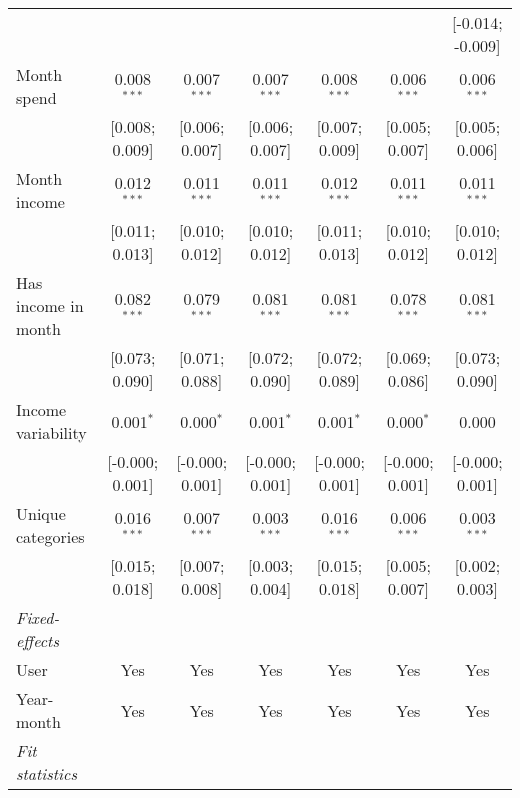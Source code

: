 \begin{table}[htbp]
\begin{threeparttable}[b]
\begin{tabular}{lcccccc}
                                    &                  &                  &                 &                  &                  & [-0.014; -0.009]\\   
         Month spend                & 0.008$^{***}$    & 0.007$^{***}$    & 0.007$^{***}$   & 0.008$^{***}$    & 0.006$^{***}$    & 0.006$^{***}$\\   
                                    & [0.008; 0.009]   & [0.006; 0.007]   & [0.006; 0.007]  & [0.007; 0.009]   & [0.005; 0.007]   & [0.005; 0.006]\\   
         Month income               & 0.012$^{***}$    & 0.011$^{***}$    & 0.011$^{***}$   & 0.012$^{***}$    & 0.011$^{***}$    & 0.011$^{***}$\\   
                                    & [0.011; 0.013]   & [0.010; 0.012]   & [0.010; 0.012]  & [0.011; 0.013]   & [0.010; 0.012]   & [0.010; 0.012]\\   
         Has income in month        & 0.082$^{***}$    & 0.079$^{***}$    & 0.081$^{***}$   & 0.081$^{***}$    & 0.078$^{***}$    & 0.081$^{***}$\\   
                                    & [0.073; 0.090]   & [0.071; 0.088]   & [0.072; 0.090]  & [0.072; 0.089]   & [0.069; 0.086]   & [0.073; 0.090]\\   
         Income variability         & 0.001$^{*}$      & 0.000$^{*}$      & 0.001$^{*}$     & 0.001$^{*}$      & 0.000$^{*}$      & 0.000\\   
                                    & [-0.000; 0.001]  & [-0.000; 0.001]  & [-0.000; 0.001] & [-0.000; 0.001]  & [-0.000; 0.001]  & [-0.000; 0.001]\\   
         Unique categories          & 0.016$^{***}$    & 0.007$^{***}$    & 0.003$^{***}$   & 0.016$^{***}$    & 0.006$^{***}$    & 0.003$^{***}$\\   
                                    & [0.015; 0.018]   & [0.007; 0.008]   & [0.003; 0.004]  & [0.015; 0.018]   & [0.005; 0.007]   & [0.002; 0.003]\\   
         \midrule
         \emph{Fixed-effects}\\
         User                       & Yes              & Yes              & Yes             & Yes              & Yes              & Yes\\  
         Year-month                 & Yes              & Yes              & Yes             & Yes              & Yes              & Yes\\  
         \midrule
         \emph{Fit statistics}\\

\end{tabular}
\end{threeparttable}
\end{table}
